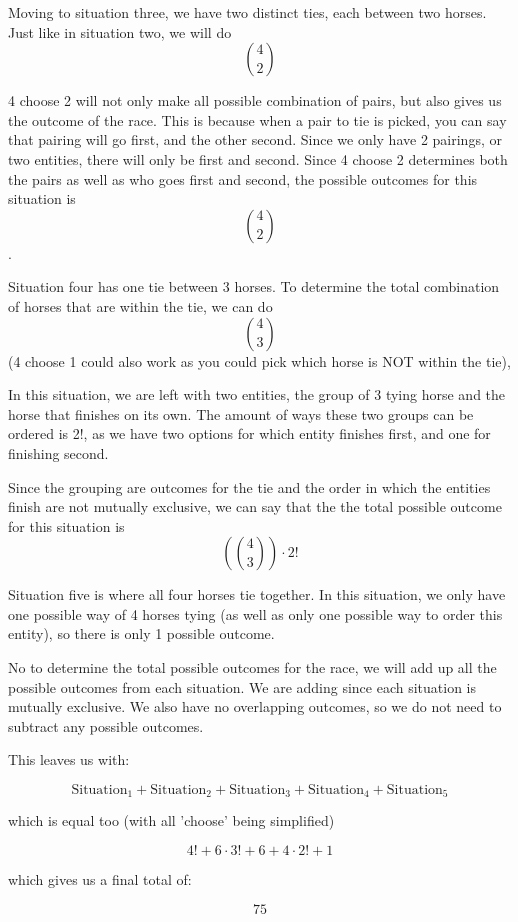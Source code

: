 \documentclass{article}
\begin{document}
Moving to situation three, we have two distinct ties, each between two horses. Just like in situation two, we will do \[
    {4} \choose{2}
\]

4 choose 2 will not only make all possible combination of pairs, but also gives us the outcome of the race. This is because when a pair to tie is picked, you can say that pairing will go first, and the other second. Since we only have 2 pairings, or two entities, there will only be first and second. Since 4 choose 2 determines both the pairs as well as who goes first and second, the possible outcomes for this situation is \[
    {4} \choose{2}
\].

Situation four has one tie between 3 horses. To determine the total combination of horses that are within the tie, we can do \[
    {4} \choose{3}
\] (4 choose 1 could also work as you could pick which horse is NOT within the tie),

In this situation, we are left with two entities, the group of 3 tying horse and the horse that finishes on its own. The amount of ways these two groups can be ordered is 2!, as we have two options for which entity finishes first, and one for finishing second.

Since the grouping are outcomes for the tie and the order in which the entities finish are not mutually exclusive, we can say that the the total possible outcome for this situation is \[
    \left(4\choose3\right) \cdot 2!
\]

Situation five is where all four horses tie together. In this situation, we only have one possible way of 4 horses tying (as well as only one possible way to order this entity), so there is only 1 possible outcome.

No to determine the total possible outcomes for the race, we will add up all the possible outcomes from each situation. We are adding since each situation is mutually exclusive. We also have no overlapping outcomes, so we do not need to subtract any possible outcomes.

This leaves us with:

\[
    \text{Situation}_{1} + \text{Situation}_{2} + \text{Situation}_{3} + \text{Situation}_{4} + \text{Situation}_{5}
\]

which is equal too (with all 'choose' being simplified)

\[4! + 6 \cdot 3! + 6 + 4 \cdot 2! + 1\]

which gives us a final total of:

\[75\]
\end{document}
